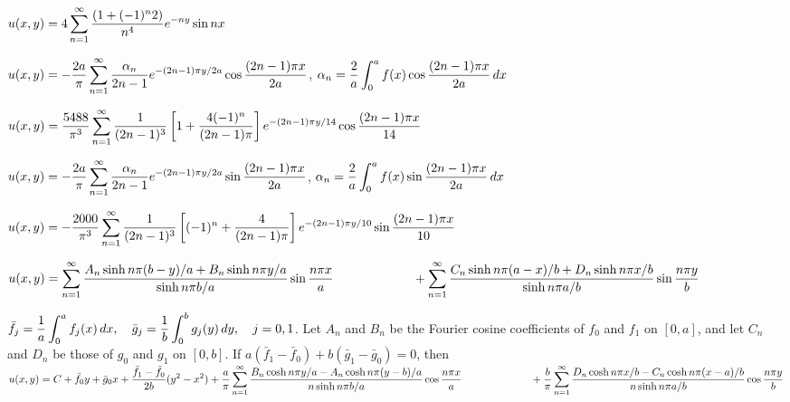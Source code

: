 \quad \quad$u(x,y)=\displaystyle4\sum_{n=1}^{\infty}\frac{(1+(-1)^{n}2)}{n^{4}}
e^{-ny}\sin nx$

$u(x,y)=-\displaystyle\frac{2a}{\pi}\sum_{n=1}^{\infty}\frac{\alpha_{n}}{2n-1}
e^{-(2n-1)\pi y/2a}\cos
\frac{(2n-1)\pi x}{2a}$,\quad
$\alpha_{n}=\displaystyle\frac{2}{a}\int_{0}^{a}
f(x)\cos\frac{(2n-1)\pi x}{2a}\,dx$

\quad \quad$u(x,y)=\displaystyle\frac{5488}{\pi^{3}}\sum_{n=1}^{\infty}\frac{1}{(2n-1)^{3}}\left[
1+\frac{4(-1)^{n}}{(2n-1)\pi}\right]e^{-(2n-1)\pi y/14}\cos\frac{(2n-1)\pi
x}{14}$

$u(x,y)=\displaystyle-\frac{2a}{\pi}\sum_{n=1}^{\infty}\frac{\alpha_{n}}{2n-1}e^{-(2n-1)\pi
y/2a}\sin
\frac{(2n-1)\pi x}{2a}$,\quad
$\alpha_{n}=\displaystyle\frac{2}{a}\int_{0}^{a}
f(x)\sin\frac{(2n-1)\pi x}{2a}\,dx$

\quad \quad$u(x,y)=-\displaystyle\frac{2000}{\pi^{3}}\sum_{n=1}^{\infty}\frac{1}{(2n-1)^{3}}\left[
(-1)^{n}+\frac{4}{(2n-1)\pi}\right]e^{-(2n-1)\pi y/10}\sin\frac{(2n-1)\pi
x}{10}$

$u(x,y)=\displaystyle
\sum_{n=1}^{\infty}\frac{A_{n}\sinh n\pi(b-y)/a+B_{n}\sinh n\pi y/a}{\sinh
n\pi b/a}\sin\frac{n\pi x}{a}\\
\hspace*{6.25em}+\sum_{n=1}^{\infty}
\frac{C_{n}\sinh n\pi(a-x)/b+D_{n}\sinh n\pi x/b}{\sinh n\pi a/b}\sin\frac{n\pi y}{b}$

$\displaystyle\bar f_{j}=\frac{1}{a}\int_{0}^{a}f_{j}(x)\,dx,\quad\bar g_{j}=\frac{1}{b}\int_{0}^{b}g_{j}(y)\,dy,\quad j=0,1$. Let $A_{n}$ and $B_{n}$ be the Fourier cosine coefficients of $f_{0}$ and $f_{1}$ on $[0,a]$, and let $C_{n}$ and $D_{n}$ be those of $g_{0}$ and $g_{1}$ on $[0,b]$. If $a(\bar f_{1}-\bar f_{0})+b(\bar g_{1}-\bar g_{0})=0$, then $\displaystyle u(x,y)=C+\bar f_{0}y+\bar g_{0}x +\frac{\bar f_{1}-\bar f_{0}}{2b}(y^{2}-x^{2})+
\frac{a}{\pi}\sum_{n=1}^{\infty}\frac{B_{n}\cosh n\pi y/a-A_{n}\cosh
n\pi(y-b)/a}{n\sinh n\pi b/a}\cos\frac{n\pi x}{a}\\
\hspace*{6.5em}+\frac{b}{\pi}\sum_{n=1}^{\infty}\frac{D_{n}\cosh n\pi
x/b-C_{n}\cosh n\pi(x-a)/b}{n\sinh n\pi a/b}\cos\frac{n\pi y}{b}$

